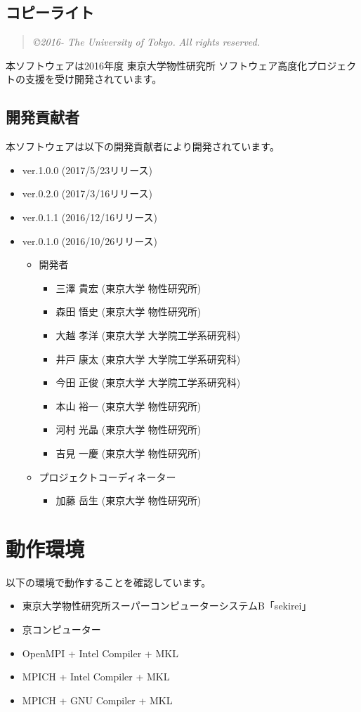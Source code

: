 \subsection{コピーライト}
\begin{quote}
{\it \copyright  2016- The University of Tokyo.} {\it All rights reserved.}
\end{quote}
本ソフトウェアは2016年度 東京大学物性研究所 ソフトウェア高度化プロジェクトの支援を受け開発されています。

\subsection{開発貢献者}
\label{subsec:developers}
本ソフトウェアは以下の開発貢献者により開発されています。
\begin{itemize}
\item{ver.1.0.0 (2017/5/23リリース)}
\item{ver.0.2.0 (2017/3/16リリース)}
\item{ver.0.1.1 (2016/12/16リリース)}
\item{ver.0.1.0 (2016/10/26リリース)}
\begin{itemize}
\item{開発者}
	\begin{itemize}
	\item{三澤 貴宏 (東京大学 物性研究所)}
	\item{森田 悟史 (東京大学 物性研究所)}
	\item{大越 孝洋 (東京大学 大学院工学系研究科)}
	\item{井戸 康太 (東京大学 大学院工学系研究科)}
	\item{今田 正俊 (東京大学 大学院工学系研究科)}
	\item{本山 裕一 (東京大学 物性研究所)}
	\item{河村 光晶 (東京大学 物性研究所)}
	\item{吉見 一慶 (東京大学 物性研究所)}
	\end{itemize}

\item{プロジェクトコーディネーター}
	\begin{itemize}
	\item{加藤 岳生 (東京大学 物性研究所)}
	\end{itemize}

\end{itemize}

\end{itemize}


\section{動作環境}
 以下の環境で動作することを確認しています。
\begin{itemize}
\item 東京大学物性研究所スーパーコンピューターシステムB「sekirei」
\item 京コンピューター
\item OpenMPI + Intel Compiler + MKL
\item MPICH + Intel Compiler + MKL
\item MPICH + GNU Compiler + MKL
\end{itemize}
